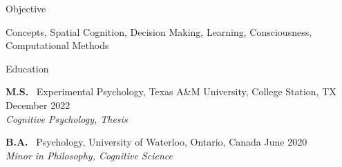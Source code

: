 \documentclass{resume} %
\begin{document}

\begin{rSection}{Objective}
	
	Concepts, Spatial Cognition, Decision Making, Learning, Consciousness, 
	Computational Methods
	
\end{rSection}

\begin{rSection}{Education}
    
    {\textbf{M.S.} \ Experimental Psychology, Texas A\&M University, College 
    Station, 
    TX \hfill {December 2022}
    \\ \textit {Cognitive Psychology, Thesis}}
    
    {\textbf{B.A.} \ Psychology, University of Waterloo, Ontario, Canada \hfill 
    { 
    June 2020}
    \\ \textit {Minor in Philosophy, Cognitive Science}}

\end{rSection}
\end{document}
